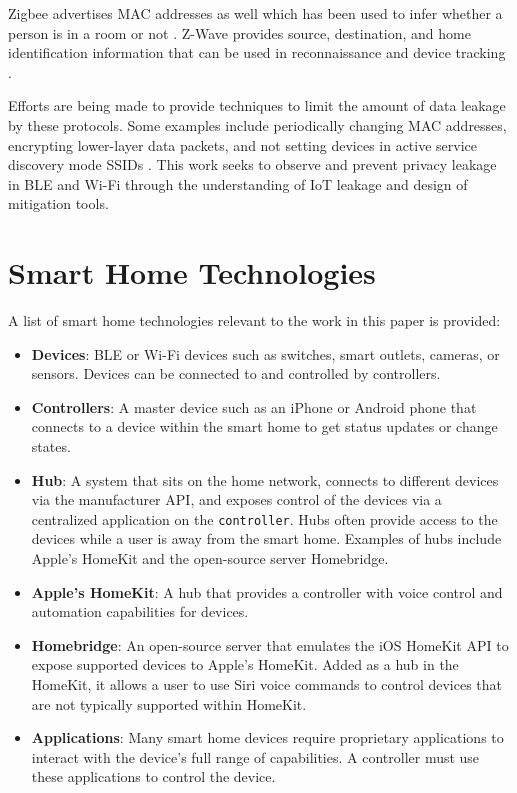 \documentclass[12pt,letterpaper,oneside]{book}
\begin{document}
			Zigbee advertises \ac{MAC} addresses as well which has been used to infer whether a person is in a room or not \cite{Konings}. Z-Wave provides source, destination, and home identification information that can be used in reconnaissance and device tracking \cite{Badenhop}.
			
			Efforts are being made to provide techniques to limit the amount of data leakage by these protocols. Some examples include periodically changing \ac{MAC} addresses, encrypting lower-layer data packets, and not setting devices in active service discovery mode \ac{SSID}s \cite{Greenstein}. This work seeks to observe and prevent privacy leakage in \ac{BLE} and Wi-Fi through the understanding of \ac{IoT} leakage and design of mitigation tools.
		
		\section{Smart Home Technologies}
		A list of smart home technologies relevant to the work in this paper is provided:
		\begin{itemize}
			\item\textbf{Devices}: \ac{BLE} or Wi-Fi devices such as switches, smart outlets, cameras, or sensors. Devices can be connected to and controlled by controllers.
			\item\textbf{Controllers}: A master device such as an iPhone or Android phone that connects to a device within the smart home to get status updates or change states.
			\item\textbf{Hub}: A system that sits on the home network, connects to different devices via the manufacturer \ac{API}, and exposes control of the devices via a centralized application on the \texttt{controller}. Hubs often provide access to the devices while a user is away from the smart home. Examples of hubs include Apple's HomeKit and the open-source server Homebridge.
			\item\textbf{Apple's HomeKit}: A hub that provides a controller with voice control and automation capabilities for devices.
			\item\textbf{Homebridge}: An open-source server that emulates the iOS HomeKit \ac{API} to expose supported devices to Apple's HomeKit. Added as a hub in the HomeKit, it allows a user to use Siri voice commands to control devices that are not typically supported within HomeKit.
			\item\textbf{Applications}: Many smart home devices require proprietary applications to interact with the device's full range of capabilities. A controller must use these applications to control the device.
		\end{itemize}
		
\end{document}
